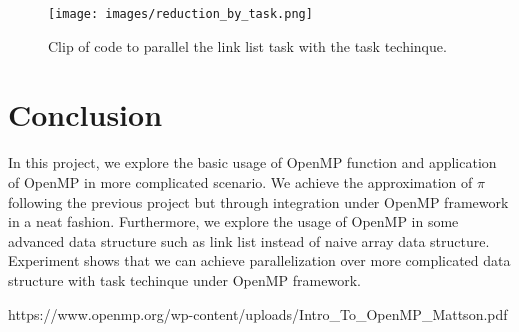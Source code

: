 \documentclass[10pt,twocolumn,letterpaper]{article}
\begin{document}
    \begin{figure}[t]
        \begin{center}
           \texttt{[image: images/reduction\_by\_task.png]}
        \end{center}
           \caption{Clip of code to parallel the link list task with the task techinque.}
        \label{fig:long}
        \label{fig:onecol}
        \label{reduction_by_task}
    \end{figure}
    
    \section{Conclusion}
    In this project, we explore the basic usage of OpenMP function and 
    application of OpenMP in more complicated scenario. We achieve the 
    approximation of $\pi$ following the previous project but through
    integration under OpenMP framework in a neat fashion. Furthermore, we explore the
    usage of OpenMP in some advanced data structure such as link
    list instead of naive array data structure. Experiment shows that
    we can achieve parallelization over more complicated data structure 
    with task techinque under OpenMP framework. 

    {\small
    
    
    }
    \begin{thebibliography}{1}

    https://www.openmp.org/wp-content/uploads/Intro\_To\_OpenMP\_Mattson.pdf
    \end{thebibliography}

    
\end{document}

